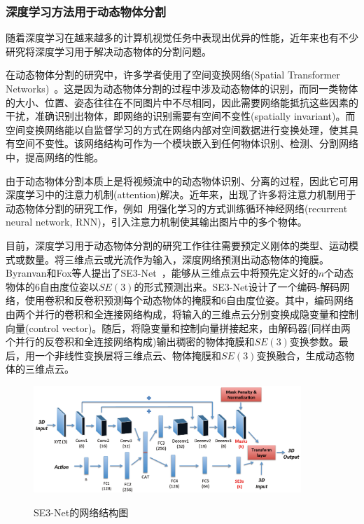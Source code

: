 

\subsubsection{深度学习方法用于动态物体分割}
\newpage
随着深度学习在越来越多的计算机视觉任务中表现出优异的性能，近年来也有不少研究将深度学习用于解决动态物体的分割问题。

在动态物体分割的研究中，许多学者使用了空间变换网络(Spatial Transformer Networks)~\cite{2015spatial}。这是因为动态物体分割的过程中涉及动态物体的识别，而同一类物体的大小、位置、姿态往往在不同图片中不尽相同，因此需要网络能抵抗这些因素的干扰，准确识别出物体，即网络的识别需要有空间不变性(spatially invariant)。而空间变换网络能以自监督学习的方式在网络内部对空间数据进行变换处理，使其具有空间不变性。该网络结构可作为一个模块嵌入到任何物体识别、检测、分割网络中，提高网络的性能。

由于动态物体分割本质上是将视频流中的动态物体识别、分离的过程，因此它可用深度学习中的注意力机制(attention)解决。近年来，出现了许多将注意力机制用于动态物体分割的研究工作，例如~\cite{2014multiple}用强化学习的方式训练循环神经网络(recurrent neural network, RNN)，引入注意力机制使其输出图片中的多个物体。

目前，深度学习用于动态物体分割的研究工作往往需要预定义刚体的类型、运动模式或数量。将三维点云或光流作为输入，深度网络预测出动态物体的掩膜。Byranvan和Fox等人提出了SE3-Net~\cite{se3}，能够从三维点云中将预先定义好的$n$个动态物体的6自由度位姿以$SE(3)$的形式预测出来。SE3-Net设计了一个编码-解码网络，使用卷积和反卷积预测每个动态物体的掩膜和6自由度位姿。其中，编码网络由两个并行的卷积和全连接网络构成，将输入的三维点云分别变换成隐变量和控制向量(control vector)。随后，将隐变量和控制向量拼接起来，由解码器(同样由两个并行的反卷积和全连接网络构成)输出稠密的物体掩膜和$SE(3)$变换参数。最后，用一个非线性变换层将三维点云、物体掩膜和$SE(3)$变换融合，生成动态物体的三维点云。

\begin{figure}[htbp]
	\centering
	\includegraphics[width=0.9\textwidth]{figs/1-2/se3-net.png} 
	\label{se3-net}
	\caption{SE3-Net的网络结构图}
\end{figure}

